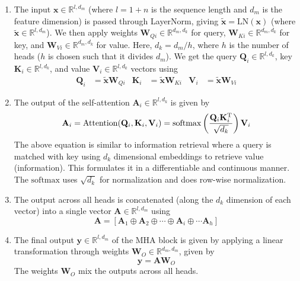 \begin{enumerate}
    \item The input $\mathbf{x} \in \mathbb{R}^{l, d_m}$ (where $l =
        1+n$ is the sequence length and $d_m$ is the feature
        dimension) is passed through LayerNorm, giving
        $\tilde{\mathbf{x}} = \mathrm{LN}(\mathbf{x})$ (where
        $\tilde{\mathbf{x}} \in \mathbb{R}^{l, d_m}$). We then apply
        weights $\mathbf{W}_{Qi} \in \mathbb{R}^{d_m, d_k}$ for query,
        $\mathbf{W}_{Ki} \in \mathbb{R}^{d_m, d_k}$ for key, and
        $\mathbf{W}_{Vi} \in \mathbb{R}^{d_m, d_k}$ for value. Here,
        $d_k = d_m / h$, where $h$ is the number of heads ($h$ is
        chosen such that it divides $d_m$). We get the query
        $\mathbf{Q}_i \in \mathbb{R}^{l, d_k}$, key $\mathbf{K}_i \in
        \mathbb{R}^{l, d_k}$, and value $\mathbf{V}_i \in
        \mathbb{R}^{l, d_k}$ vectors using
        \begin{align}
            \mathbf{Q}_i &= \tilde{\mathbf{x}} \mathbf{W}_{Qi} &
            \mathbf{K}_i &= \tilde{\mathbf{x}} \mathbf{W}_{Ki} &
            \mathbf{V}_i &= \tilde{\mathbf{x}} \mathbf{W}_{Vi}
        \end{align}
    
    \item The output of the self-attention $\mathbf{A}_{i} \in
        \mathbb{R}^{l, d_k}$ is given
        by
        \begin{align}
            \mathbf{A}_i = \mathrm{Attention}(\mathbf{Q}_i, 
                \mathbf{K}_i, \mathbf{V}_i) = \mathrm{softmax} \left(
                    \frac{\mathbf{Q}_i \mathbf{K}_i^\textup{T}}
                        {\sqrt{d_k}}\right) \mathbf{V}_i
        \end{align}
        The above equation is similar to information retrieval where a
        query is matched with key using $d_k$ dimensional embeddings
        to retrieve value (information). This formulates it in a
        differentiable and continuous manner. The $\mathrm{softmax}$
        uses $\sqrt{d_k}$ for normalization and does row-wise
        normalization.
    
    \item The output across all heads is concatenated (along the $d_k$
        dimension of each vector) into a single vector $\mathbf{A} \in
        \mathbb{R}^{l, d_m}$ using
        \begin{equation}
            \mathbf{A} = \left[\mathbf{A}_1 \oplus \mathbf{A}_2 \oplus 
                \cdots \oplus \mathbf{A}_i \oplus \cdots \mathbf{A}_h
                \right]
        \end{equation}
    
    \item The final output $\mathbf{y} \in \mathbb{R}^{l, d_m}$ of the
        MHA block is given by applying a linear transformation through
        weights $\mathbf{W}_O \in \mathbb{R}^{d_m, d_m}$, given by
        \begin{equation}
            \mathbf{y} = \mathbf{A} \mathbf{W}_O
        \end{equation}
        The weights $\mathbf{W}_O$ mix the outputs across all heads.
\end{enumerate}

